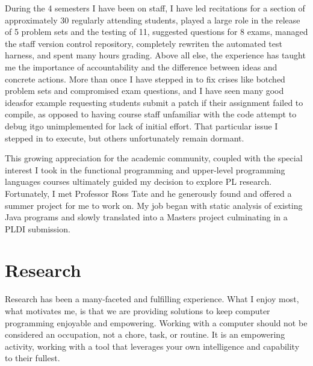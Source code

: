 \documentclass{article}
\begin{document}
During the 4 semesters I have been on staff, I have led recitations for a section of approximately 30 regularly attending students, played a large role in the release of 5 problem sets and the testing of 11, suggested questions for 8 exams, managed the staff version control repository, completely rewriten the automated test harness, and spent many hours grading.
Above all else, the experience has taught me the importance of accountability and the difference between ideas and concrete actions.
More than once I have stepped in to fix crises like botched problem sets and compromised exam questions, and I have seen many good ideas\textemdash for example requesting students submit a patch if their assignment failed to compile, as opposed to having course staff unfamiliar with the code attempt to debug it\textemdash go unimplemented for lack of initial effort.
That particular issue I stepped in to execute, but others unfortunately remain dormant.

This growing appreciation for the academic community, coupled with the special interest I took in the functional programming and upper-level programming languages courses ultimately guided my decision to explore PL research.
Fortunately, I met Professor Ross Tate and he generously found and offered a summer project for me to work on.
My job began with static analysis of existing Java programs and slowly translated into a Masters project culminating in a PLDI submission.

\section{Research}
Research has been a many-faceted and fulfilling experience.
What I enjoy most, what motivates me, is that we are providing solutions to keep computer programming enjoyable and empowering.
Working with a computer should not be considered an occupation, not a chore, task, or routine.
It is an empowering activity, working with a tool that leverages your own intelligence and capability to their fullest.
\end{document}
